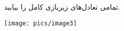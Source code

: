 تمامی تعادل‌های زیربازی کامل را بیابید.
\begin{center}
    \texttt{[image: pics/image3]}
\end{center}